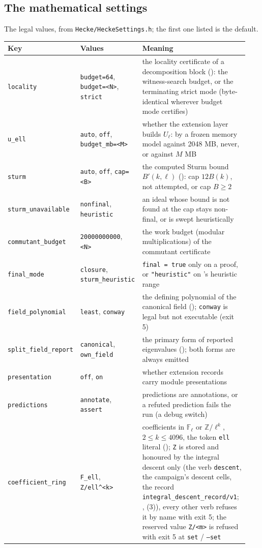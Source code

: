\documentclass[11pt,openany]{report}
\newcommand{\Z}{\mathbb{Z}}
\newcommand{\Fl}{\mathbb{F}_{\ell}}
\newcommand{\Ecite}[1]{{\ttfamily[E,~#1]}}
\newcommand{\cli}[1]{\texttt{#1}}
\newcommand{\file}[1]{\nolinkurl{#1}}
\newcommand{\vb}[1]{\texttt{#1}}
\begin{document}
\subsection{The \CMNumMathSettings{} mathematical settings}\label{sec:mathsettings}

The legal values, from \file{Hecke/HeckeSettings.h}; the first one listed is the default.
{\small
\begin{longtable}{@{}>{\raggedright\arraybackslash}p{0.2\linewidth}>{\raggedright\arraybackslash}p{0.26\linewidth}>{\raggedright\arraybackslash}p{0.48\linewidth}@{}}
\toprule
\textbf{Key} & \textbf{Values} & \textbf{Meaning}\\\midrule\endhead
\vb{locality} & \vb{budget=64}, \vb{budget=<N>}, \vb{strict} & the locality certificate of a decomposition block (\Ecite{sec:localcert}): the witness-search budget, or the terminating strict mode (byte-identical wherever budget mode certifies)\\
\vb{u\_ell} & \vb{auto}, \vb{off}, \vb{budget\_mb=<M>} & whether the extension layer builds $U_\ell$: by a frozen memory model against 2048 MB, never, or against $M$ MB\\
\vb{sturm} & \vb{auto}, \vb{off}, \vb{cap=<B>} & the computed Sturm bound $B'(k,\ell)$ (\Ecite{def:bprime}): cap $12B(k)$, not attempted, or cap $B\ge2$\\
\vb{sturm\_unavailable} & \vb{nonfinal}, \vb{heuristic} & an ideal whose bound is not found at the cap stays non-final, or is swept heuristically\\
\vb{commutant\_budget} & \vb{20000000000}, \vb{<N>} & the work budget (modular multiplications) of the commutant certificate\\
\vb{final\_mode} & \vb{closure}, \vb{sturm\_heuristic} & \texttt{final = true} only on a proof, or \texttt{"heuristic"} on \Ecite{cert:sturm}'s heuristic range\\
\vb{field\_polynomial} & \vb{least}, \vb{conway} & the defining polynomial of the canonical field (\Ecite{def:canon}); \vb{conway} is legal but not executable (exit 5)\\
\vb{split\_field\_report} & \vb{canonical}, \vb{own\_field} & the primary form of reported eigenvalues (\Ecite{sec:field}); both forms are always emitted\\
\vb{presentation} & \vb{off}, \vb{on} & whether extension records carry module presentations\\
\vb{predictions} & \vb{annotate}, \vb{assert} & predictions are annotations, or a refuted prediction fails the run (a debug switch)\\
\vb{coefficient\_ring} & \vb{F\_ell}, \vb{Z/ell\^{}<k>} & coefficients in $\Fl$ or $\Z/\ell^k$, $2\le k\le4096$, the token \texttt{ell} literal (\Ecite{sec:ring}); \vb{Z} is stored and honoured by the integral descent only (the verb \vb{descent}, the campaign's descent cells, the record \texttt{integral\_descent\_record/v1}; {}, {}(3)), every other verb refuses it by name with exit 5; the reserved value \vb{Z/<m>} is refused with exit 5 at \texttt{set} / \cli{--set}\\
\bottomrule
\end{longtable}
}
\end{document}
